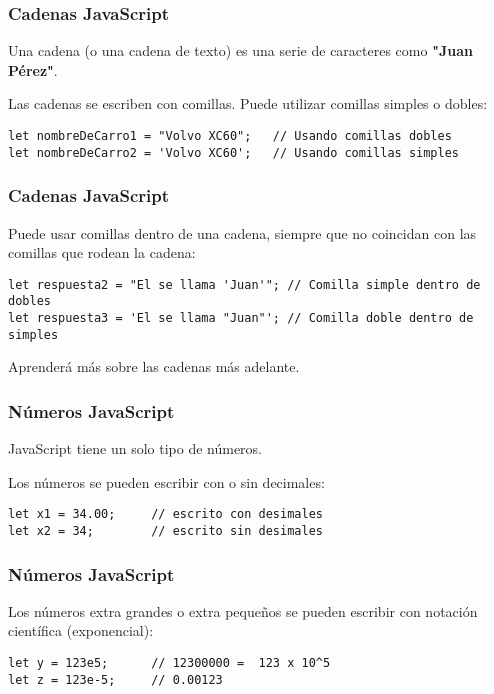 \begin{frame}[fragile]
  \frametitle{Cadenas JavaScript}

  Una cadena (o una cadena de texto) es una serie de
  caracteres como \textbf{"Juan Pérez"}.

  Las cadenas se escriben con comillas. Puede utilizar
  comillas simples o dobles:
  \vspace{\baselineskip}
  \begin{lstlisting}
let nombreDeCarro1 = "Volvo XC60";   // Usando comillas dobles
let nombreDeCarro2 = 'Volvo XC60';   // Usando comillas simples
  \end{lstlisting}
\end{frame}

\begin{frame}[fragile]
  \frametitle{Cadenas JavaScript}

  Puede usar comillas dentro de una cadena, siempre que no
  coincidan con las comillas que rodean la cadena:

  \vspace{\baselineskip}
  \begin{lstlisting}
let respuesta2 = "El se llama 'Juan'"; // Comilla simple dentro de dobles
let respuesta3 = 'El se llama "Juan"'; // Comilla doble dentro de simples
  \end{lstlisting}

  \vspace{\baselineskip}
  Aprenderá más sobre las cadenas más adelante.
\end{frame}

\begin{frame}[fragile]
  \frametitle{Números JavaScript}

  JavaScript tiene un solo tipo de números.

  Los números se pueden escribir con o sin decimales:
  \vspace{\baselineskip}
  \begin{lstlisting}
let x1 = 34.00;     // escrito con desimales
let x2 = 34;        // escrito sin desimales
  \end{lstlisting}
\end{frame}

\begin{frame}[c]{}
\end{frame}

\begin{frame}[fragile]
  \frametitle{Números JavaScript}

  Los números extra grandes o extra pequeños se pueden escribir
  con notación científica (exponencial):

  \vspace{\baselineskip}
  \begin{lstlisting}
let y = 123e5;      // 12300000 =  123 x 10^5
let z = 123e-5;     // 0.00123 
  \end{lstlisting}
\end{frame}

